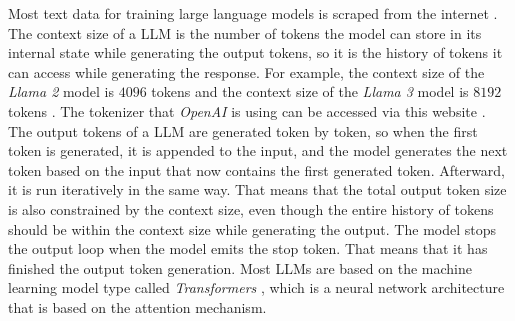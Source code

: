 \documentclass[draft,final]{thesisclass} %
\begin{document}
Most text data for training large language models is scraped from the internet \parencite[1]{llm_literature_review}.
The context size of a \gls{LLM} is the number of tokens the model can store in its internal state while generating the output tokens, so it is the history of tokens it can access while generating the response.
For example, the context size of the \textit{Llama 2} model is $4096$ tokens \parencite[47]{llama2} and the context size of the \textit{Llama 3} model is $8192$ tokens \parencite[1]{llama3}.
The tokenizer that \textit{OpenAI} is using can be accessed via this website \textcite{openai_tokenizer}.
The output tokens of a \gls{LLM} are generated token by token, so when the first token is generated, it is appended to the input, and the model generates the next token based on the input that now contains the first generated token. Afterward, it is run iteratively in the same way.
That means that the total output token size is also constrained by the context size, even though the entire history of tokens should be within the context size while generating the output.
The model stops the output loop when the model emits the stop token. That means that it has finished the output token generation.
Most \gls{LLM}s are based on the machine learning model type called \textit{Transformers} \parencite[1]{transformer}, which is a neural network architecture that is based on the attention mechanism.
\end{document}
